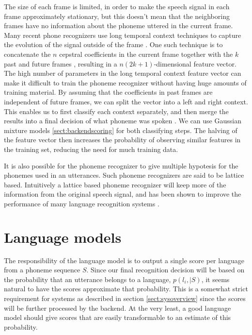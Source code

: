 The size of each frame is limited, in order to make the speech signal in each frame approximately stationary, but this doesn't mean that the neighboring frames have no information about the phoneme uttered in the current frame. Many recent phone recognizers use long temporal context techniques to capture the evolution of the signal outside of the frame \cite[p. 8]{butphnrec}. One such technique is to concatenate the $n$ cepstral coefficients in the current frame together with the $k$ past and future frames \cite[9]{butphnrec}, resulting in a $n(2k+1)$-dimensional feature vector. The high number of parameters in the long temporal context feature vector can make it difficult to train the phoneme recognizer without having huge amounts of training material. By assuming that the coefficients in past frames are independent of future frames, we can split the vector into a left and right context. This enables us to first classify each context separately, and then merge the results into a final decision of what phoneme was spoken \cite[p. 36]{butphnrec}. We can use Gaussian mixture models \ref{sect:backendscoring} for both classifying steps. The halving of the feature vector then increases the probability of observing similar features in the training set, reducing the need for much training data.

It is also possible for the phoneme recognizer to give multiple hypotesis for the phonemes used in an utterances. Such phoneme recognizers are said to be lattice based. Intuitively a lattice based phoneme recognizer will keep more of the information from the original speech signal, and has been shown to improve the performance of many language recognition systems \cite[p. 818]{lidbok}.


\section{Language models}
\label{sect:basiclangmodel}

The responsibility of the language model is to output a single score per language from a phoneme sequence $S$. Since our final recognition decision will be based on the probability that an utterance belongs to a language, $p(l_i, | S)$, it seems natural to have the scores approximate that probability. This is a somewhat strict requirement for systems as described in section \ref{sect:sysoverview} since the scores will be further processed by the backend. At the very least, a good language model should give scores that are easily transformable to an estimate of this probability. 

